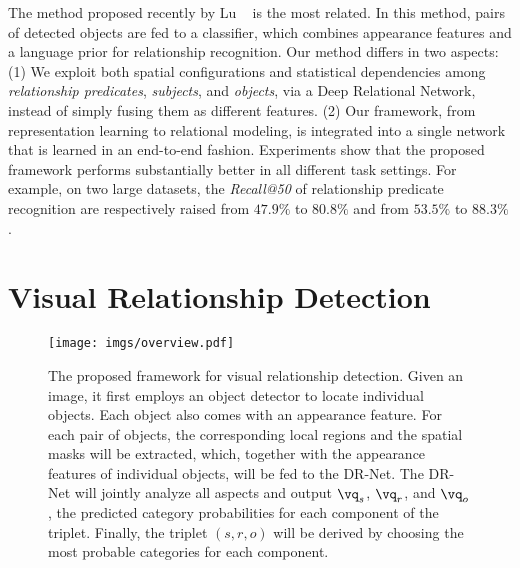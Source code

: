 \documentclass[10pt,twocolumn,letterpaper]{article}
\begin{document}
The method proposed recently by Lu \etal~\cite{lu2016visual} is the most related. 
In this method, pairs of detected objects are fed to a classifier, which combines
appearance features and a language prior for relationship recognition. 
%
Our method differs in two aspects:
(1) We exploit both spatial configurations and statistical dependencies among 
\emph{relationship predicates}, \emph{subjects}, and \emph{objects},
via a Deep Relational Network, instead of simply fusing them as different features.
(2) Our framework, from representation learning to relational modeling, is integrated 
into a single network that is learned in an end-to-end fashion.
%
Experiments show that the proposed framework performs substantially better in 
all different task settings. For example, on two large datasets, 
the \emph{Recall@50} of relationship predicate recognition are respectively raised from 
$47.9\%$ to $80.8\%$ and from $53.5\%$ to $88.3\%$. 

%
%
%
%
\section{Visual Relationship Detection}\label{sec:ovalfrm}\begin{figure*}
    \centering
    \texttt{[image: imgs/overview.pdf]}
    \caption{\small
    The proposed framework for visual relationship detection.
    Given an image, it first employs an object detector to locate individual objects.
    Each object also comes with an appearance feature.
    For each pair of objects, the corresponding local regions and the spatial masks 
    will be extracted, which, together with the appearance features 
    of individual objects, will be fed to the DR-Net. 
    The DR-Net will jointly analyze all aspects
    and output $\vq_s$, $\vq_r$, and $\vq_o$, the predicted category 
    probabilities for each component of the triplet. 
    Finally, the triplet $(s, r, o)$ will be derived by choosing the most probable 
    categories for each component.}
    \label{fig:overview}
\end{figure*}
\end{document}
